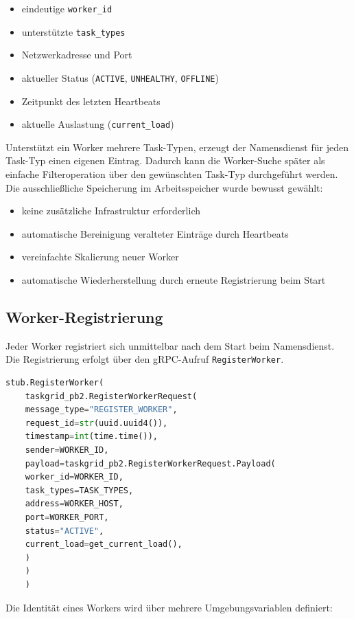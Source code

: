 \begin{itemize}
	\item eindeutige \texttt{worker\_id}
	\item unterstützte \texttt{task\_types}
	\item Netzwerkadresse und Port
	\item aktueller Status (\texttt{ACTIVE}, \texttt{UNHEALTHY}, \texttt{OFFLINE})
	\item Zeitpunkt des letzten Heartbeats
	\item aktuelle Auslastung (\texttt{current\_load})
\end{itemize}
Unterstützt ein Worker mehrere Task-Typen, erzeugt der Namensdienst für jeden Task-Typ einen eigenen Eintrag.
Dadurch kann die Worker-Suche später als einfache Filteroperation über den gewünschten Task-Typ durchgeführt werden.
Die ausschließliche Speicherung im Arbeitsspeicher wurde bewusst gewählt:

\begin{itemize}
	\item keine zusätzliche Infrastruktur erforderlich
	\item automatische Bereinigung veralteter Einträge durch Heartbeats
	\item vereinfachte Skalierung neuer Worker
	\item automatische Wiederherstellung durch erneute Registrierung beim Start
\end{itemize}

\subsection{Worker-Registrierung}

Jeder Worker registriert sich unmittelbar nach dem Start beim Namensdienst.
Die Registrierung erfolgt über den gRPC-Aufruf \texttt{RegisterWorker}.

\begin{lstlisting}[language=Python,caption={Worker-Registrierung (worker.py)}]
	stub.RegisterWorker(
	taskgrid_pb2.RegisterWorkerRequest(
	message_type="REGISTER_WORKER",
	request_id=str(uuid.uuid4()),
	timestamp=int(time.time()),
	sender=WORKER_ID,
	payload=taskgrid_pb2.RegisterWorkerRequest.Payload(
	worker_id=WORKER_ID,
	task_types=TASK_TYPES,
	address=WORKER_HOST,
	port=WORKER_PORT,
	status="ACTIVE",
	current_load=get_current_load(),
	)
	)
	)
\end{lstlisting}

Die Identität eines Workers wird über mehrere Umgebungsvariablen definiert:

